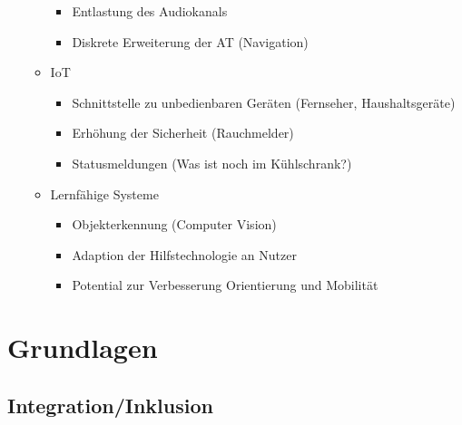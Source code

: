 \documentclass[paper=a4, fontsize=11pt]{scrartcl} %
\numberwithin{equation}{section} %
\numberwithin{figure}{section} %
\numberwithin{table}{section} %
\begin{document}
\begin{itemize}
\begin{itemize}
\begin{itemize}
\item Entlastung des Audiokanals
\item Diskrete Erweiterung der AT (Navigation)
\end{itemize}
\item IoT
\begin{itemize}
\item Schnittstelle zu unbedienbaren Geräten (Fernseher, Haushaltsgeräte)
\item Erhöhung der Sicherheit (Rauchmelder)
\item Statusmeldungen (Was ist noch im Kühlschrank?)
\end{itemize}
\item Lernfähige Systeme
\begin{itemize}
\item Objekterkennung (Computer Vision)
\item Adaption der Hilfstechnologie an Nutzer
\item Potential zur Verbesserung Orientierung und Mobilität
\end{itemize}
\end{itemize}
\end{itemize}

\section{Grundlagen}

\subsection{Integration/Inklusion}
\end{document}
